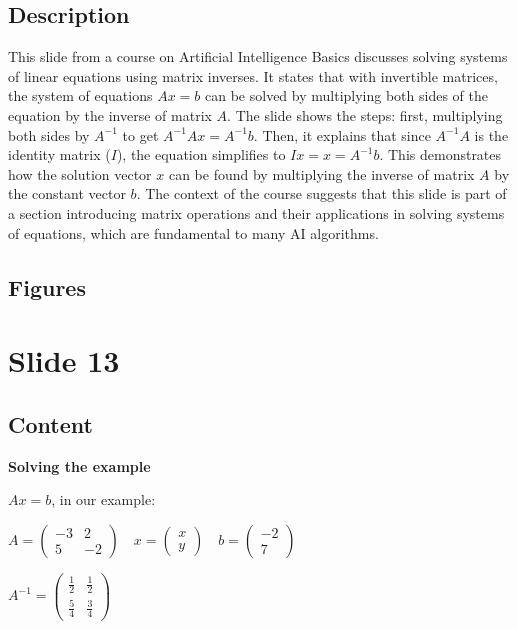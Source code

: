 \documentclass{article}%
\begin{document}
\subsection{Description}%
This slide from a course on Artificial Intelligence Basics discusses solving systems of linear equations using matrix inverses.  It states that with invertible matrices, the system of equations $Ax = b$ can be solved by multiplying both sides of the equation by the inverse of matrix $A$.  The slide shows the steps: first, multiplying both sides by $A^{-1}$ to get $A^{-1}Ax = A^{-1}b$.  Then, it explains that since $A^{-1}A$ is the identity matrix ($I$), the equation simplifies to $Ix = x = A^{-1}b$.  This demonstrates how the solution vector $x$ can be found by multiplying the inverse of matrix $A$ by the constant vector $b$. The context of the course suggests that this slide is part of a section introducing matrix operations and their applications in solving systems of equations, which are fundamental to many AI algorithms.%
\subsection{Figures}%
\begin{figure}[H]%
\centering%
\end{figure}

%
\newpage%
\section{Slide 13}%
\label{sec:Slide13}%
\subsection{Content}%

\textbf{Solving the example}

$Ax = b$, in our example:

$A = \begin{pmatrix} -3 & 2 \\ 5 & -2 \end{pmatrix} \quad x = \begin{pmatrix} x \\ y \end{pmatrix} \quad b = \begin{pmatrix} -2 \\ 7 \end{pmatrix}$

$A^{-1} = \begin{pmatrix} \frac{1}{2} & \frac{1}{2} \\ \frac{5}{4} & \frac{3}{4} \end{pmatrix}$
\end{document}
